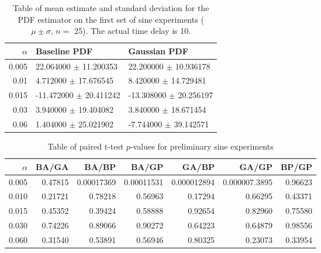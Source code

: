 \documentclass[a4paper,11pt]{article}
\begin{document}
\begin{appendices}
\begin{table}[htb]
\caption{Table of mean estimate and standard deviation for the PDF estimator on the first set of sine experiments ($\mu\pm\sigma,\,n=$ 25). The actual time delay is 10.} 
\begin{center}
\begin{tabular}{r|ll}
 $\alpha$  &  Baseline PDF                &  Gaussian PDF                \\
\hline
    0.005  &  22.064000 $\pm$ 11.200353   &  22.200000 $\pm$ 10.936178   \\
     0.01  &  4.712000 $\pm$ 17.676545    &  8.420000 $\pm$ 14.729481    \\
    0.015  &  -11.472000 $\pm$ 20.411242  &  -13.308000 $\pm$ 20.256197  \\
     0.03  &  3.940000 $\pm$ 19.404082    &  3.840000 $\pm$ 18.671454    \\
     0.06  &  1.404000 $\pm$ 25.021902    &  -7.744000 $\pm$ 39.142571   \\
\end{tabular}
\end{center}
\end{table}



\begin{table}[htb]
\caption{Table of paired t-test $p$-values for preliminary sine experiments} 
\begin{center}
\begin{tabular}{r|rrrrrr}
 $\alpha$  &    BA/GA  &       BA/BP  &       BA/GP  &        GA/BP  &          GA/GP  &    BP/GP  \\
\hline
    0.005  &  0.47815  &  0.00017369  &  0.00011531  &  0.000012894  &  0.000007.3895  &  0.96623  \\
    0.010  &  0.21721  &     0.78218  &     0.56963  &      0.17294  &        0.66295  &  0.43371  \\
    0.015  &  0.45352  &     0.39424  &     0.58888  &      0.92654  &        0.82960  &  0.75580  \\
    0.030  &  0.74226  &     0.89066  &     0.90272  &      0.64223  &        0.64879  &  0.98556  \\
    0.060  &  0.31540  &     0.53891  &     0.56946  &      0.80325  &        0.23073  &  0.33954  \\
\end{tabular}
\end{center}
\end{table}



\end{appendices}
\end{document}
